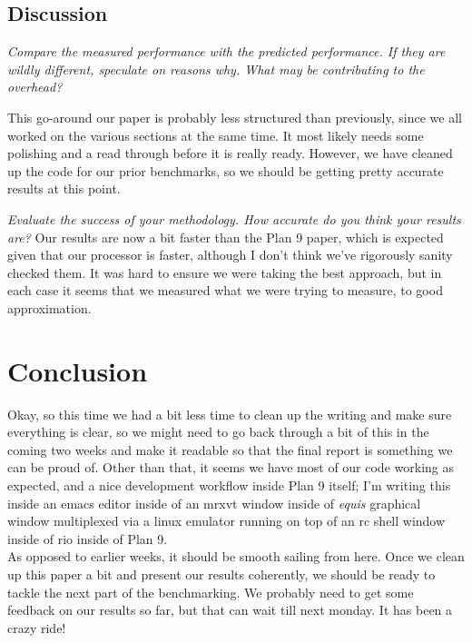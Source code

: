 \documentclass[letterpaper,twocolumn,10pt]{article}
\begin{document}
\subsection{Discussion}
\textit{Compare the measured performance with the predicted performance. If they are wildly different, speculate on reasons why. What may be contributing to the overhead?}

This go-around our paper is probably less structured than previously, since we all worked on the various sections at the same time. It most likely needs some polishing and a read through before it is really ready. However, we have cleaned up the code for our prior benchmarks, so we should be getting pretty accurate results at this point.

    
    \textit{Evaluate the success of your methodology. How accurate do you think your results are?}
    Our results are now a bit faster than the Plan 9 paper, which is expected given that our processor is faster, although I don't think we've rigorously sanity checked them. It was hard to ensure we were taking the best approach, but in each case it seems that we measured what we were trying to measure, to good approximation.

\section{Conclusion}

Okay, so this time we had a bit less time to clean up the writing and make sure everything is clear, so we might need to go back through a bit of this in the coming two weeks and make it readable so that the final report is something we can be proud of. Other than that, it seems we have most of our code working as expected, and a nice development workflow inside Plan 9 itself; I'm writing this inside an emacs editor inside of an mrxvt window inside of \textit{equis} graphical window multiplexed via a linux emulator running on top of an rc shell window inside of rio inside of Plan 9. \\

As opposed to earlier weeks, it should be smooth sailing from here. Once we clean up this paper a bit and present our results coherently, we should be ready to tackle the next part of the benchmarking. We probably need to get some feedback on our results so far, but that can wait till next monday. It has been a crazy ride!

{\normalsize 
}


\end{document}
